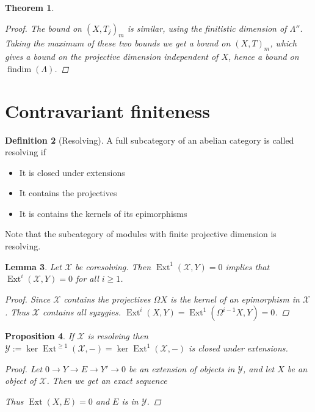 \documentclass[11pt, a4paper, english]{article}
\newtheorem{theorem}{Theorem}[section]
\newtheorem{prop}[theorem]{Proposition}
\newtheorem{lemma}[theorem]{Lemma}
\theoremstyle{definition}
\newtheorem{defn}[theorem]{Definition}
\DeclareMathOperator{\Ext}{Ext}
\DeclareMathOperator{\findim}{findim}
\begin{document}
\begin{theorem}
\begin{proof}
		The bound on $(X, T_j)_m$ is similar, using the finitistic dimension of $\Lambda''$. Taking the maximum of these two bounds we get a bound on $(X, T)_m$, which gives a bound on the projective dimension independent of $X$, hence a bound on $\findim(\Lambda)$. 
	\end{proof}
\end{theorem}

\section{Contravariant finiteness}

\begin{defn}[Resolving]
	A full subcategory of an abelian category is called resolving if 
	\begin{itemize}
		\item It is closed under extensions
		\item It contains the projectives
		\item It is contains the kernels of its epimorphisms
	\end{itemize}
\end{defn}

Note that the subcategory of modules with finite projective dimension is resolving.


\begin{lemma}\label{lem:coresolving_ext_vanish}
	Let $\mathcal X$ be coresolving. Then $\Ext^1(\mathcal X, Y) = 0$ implies that $\Ext^i(\mathcal X, Y)=0$ for all $i \geq 1$.
	\begin{proof}
		Since $\mathcal X$ contains the projectives $\Omega X$ is the kernel of an epimorphism in $\mathcal X$. Thus $\mathcal X$ contains all syzygies. $\Ext^i(X, Y) = \Ext^1(\Omega^{i-1}X, Y) = 0$.
	\end{proof}
\end{lemma}

\begin{prop}\label{prop:complement_closed_under_extension}
	If $\mathcal X$ is resolving then $\mathcal Y := \ker\Ext^{\geq 1}(\mathcal X, -) = \ker\Ext^{1}(\mathcal X, -)$ is closed under extensions.
	\begin{proof}
		Let $0 \to Y \to E \to Y' \to 0$ be an extension of objects in $\mathcal Y$, and let $X$ be an object of $\mathcal X$. Then we get an exact sequence  
		\begin{center}
		\end{center}
		Thus $\Ext(X, E)=0$ and $E$ is in $\mathcal Y$.
	\end{proof}
\end{prop}
\end{document}
